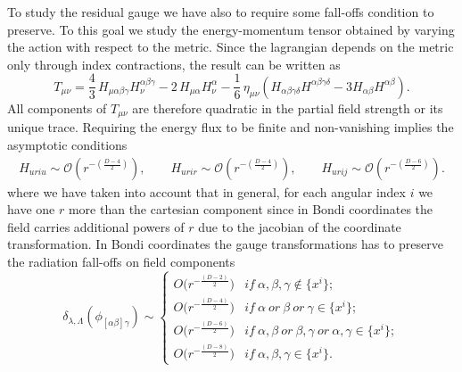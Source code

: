 \documentclass[a4paper,12pt]{article}
\begin{document}
To study the residual gauge we have also to require some fall-offs condition to preserve. To this goal we study the energy-momentum tensor obtained by varying the action with respect to the metric. Since the lagrangian depends on the metric only through index contractions, the result can be written as
\begin{equation}
T_{\mu\nu}
=
\frac{4}{3}\,
H_{\mu\alpha\beta\gamma} H_{\nu}^{\alpha\beta\gamma}
- 2\,
H_{\mu\alpha} H_{\nu}^{\alpha}
-\frac{1}{6}\,
\eta_{\mu\nu}
\left(
H_{\alpha\beta\gamma\delta} H^{\alpha\beta\gamma\delta}
- 3 H_{\alpha\beta} H^{\alpha\beta}
\right).
\end{equation}
All components of $T_{\mu\nu}$ are therefore quadratic in the partial field strength or its unique trace. Requiring the energy flux to be finite and non-vanishing implies the asymptotic conditions
\begin{equation}
\begin{aligned}
    H_{uriu} \sim \mathcal{O}(r^{-(\frac{D-4}{2})}), \qquad  H_{urir} \sim \mathcal{O}(r^{-(\frac{D-4}{2})}), \qquad  H_{urij} \sim \mathcal{O}(r^{-(\frac{D-6}{2})}).
    \label{leadingHcharge}
\end{aligned}    
\end{equation}
where we have taken into account that in general, for each angular index $i$ we have one $r$ more than the cartesian component since in Bondi coordinates the field carries additional powers of $r$ due to the jacobian of the coordinate transformation. In Bondi coordinates the gauge transformations has to preserve the radiation fall-offs on field components
\begin{equation}
\delta_{\lambda,\Lambda}(\phi_{[\alpha \beta]\gamma})\sim  \begin{cases}
        O\big(r^{-\frac{(D-2)}{2}}\big)& if \ \alpha,\beta, \gamma \notin \{x^i\};\\
        O\big(r^{-\frac{(D-4)}{2}}\big)& if \ \alpha \ or \ \beta \ or \ \gamma \in \{x^i\};\\
        O\big(r^{-\frac{(D-6)}{2}}\big)& if \ \alpha,\beta \ or \ \beta, \gamma \ or \ \alpha, \gamma \in \{x^i\};\\
        O\big(r^{-\frac{(D-8)}{2}}\big)& if \ \alpha,\beta, \gamma  \in \{x^i\}.
    \end{cases}
\end{equation}
\end{document}
